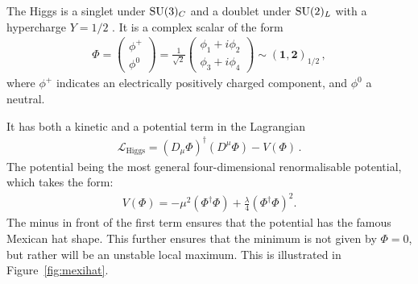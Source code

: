 The Higgs is a singlet under $\mathrm{SU}(3)_C$ and a doublet under $\mathrm{SU}(2)_L$ with a hypercharge $Y=1/2$ \cite{Georgi:1999wka}. It is a complex scalar of the form
\begin{align}
    \Phi = \begin{pmatrix} \phi^+ \\ \phi^0 \end{pmatrix} = \frac{1}{\sqrt{2}} \begin{pmatrix} \phi_1 + i\phi_2 \\ \phi_3 + i\phi_4 \end{pmatrix} \sim (\mathbf{1}, \mathbf{2})_{1/2}\,,\label{eq:Higgs1}
\end{align}
where $\phi^+$ indicates an electrically positively charged component, and $\phi^0$ a neutral. 

It has both a kinetic and a potential term in the Lagrangian 
\begin{align}
    \mathcal{L}_{\mathrm{Higgs}} = (D_\mu \Phi)^\dagger (D^\mu \Phi) - V(\Phi)\,.\label{eq:LHiggs}
\end{align}
The potential being the most general four-dimensional renormalisable potential, which takes the form:
\begin{align}
    V(\Phi) = -\mu^2 (\Phi^\dagger \Phi) + \frac{\lambda}{4} (\Phi^\dagger \Phi)^2.\label{eq:Mexipot}
\end{align}
The minus in front of the first term ensures that the potential has the famous Mexican hat shape. This further ensures that the minimum is not given by $\Phi=0$, but rather will be an unstable local maximum. This is illustrated in Figure~\ref{fig:mexihat}. 
